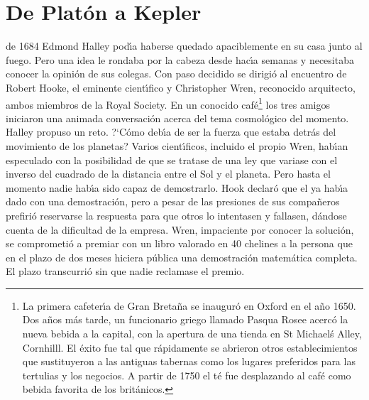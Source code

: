 \section{De Plat\'on a Kepler}


 de 1684 Edmond Halley pod\'\i{}a haberse quedado apaciblemente en su casa junto al fuego. Pero una idea le rondaba por la cabeza desde hac\'\i{}a semanas y necesitaba conocer la opini\'on de sus colegas. Con paso decidido se dirigi\'o al encuentro de Robert Hooke, el eminente cient\'\i{}fico y Christopher Wren, reconocido arquitecto, ambos miembros de la Royal Society. En un conocido caf\'e\footnote{La primera cafeter\'\i{}a de Gran Breta\~{n}a se inaugur\'o en Oxford en el a\~{n}o 1650. Dos a\~{n}os m\'as tarde, un funcionario griego llamado Pasqua Rosee acerc\'o la nueva bebida a la capital, con la apertura de una tienda en St Michael\'s Alley, Cornhilll. El \'exito fue tal que r\'apidamente se abrieron otros establecimientos que sustituyeron a las antiguas tabernas como los lugares preferidos para las tertulias y los negocios. A partir de 1750 el t\'e fue desplazando al caf\'e como bebida favorita de los brit\'anicos.} los tres amigos iniciaron una animada conversaci\'on acerca del tema cosmol\'ogico del momento. Halley propuso un reto. ?`C\'omo deb\'\i{}a de ser la fuerza que estaba detr\'as del movimiento de los planetas? Varios cient\'\i{}ficos, incluido el propio Wren, hab\'\i{}an especulado con la posibilidad de que se tratase de una ley que variase con el inverso del cuadrado de la distancia entre el Sol y el planeta. Pero hasta el momento nadie hab\'\i{}a sido capaz de demostrarlo. Hook declar\'o que el ya hab\'\i{}a dado con una demostraci\'on, pero a pesar de las presiones de sus compa\~neros prefiri\'o reservarse la respuesta para que otros lo intentasen y fallasen, d\'andose cuenta de la dificultad de la empresa. Wren, impaciente por conocer la soluci\'on, se comprometi\'o a premiar con un libro valorado en 40 chelines a  la persona que en el plazo de dos meses hiciera p\'ublica una demostraci\'on matem\'atica completa. El plazo transcurri\'o sin que nadie reclamase el premio. 


